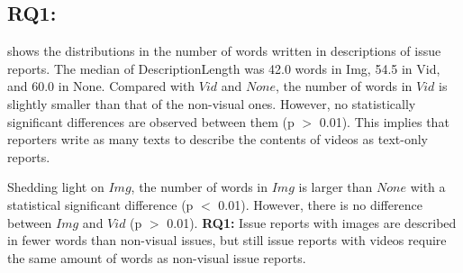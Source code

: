 % 



\subsection*{RQ1: \RQone{}}

 shows the distributions in the number of words written in descriptions of issue reports. The median of DescriptionLength was 42.0 words in Img, 54.5 in Vid, and 60.0 in None. 
Compared with $Vid$ and $None$, the number of words in $Vid$ is slightly smaller than that of the non-visual ones. However, no statistically significant differences are observed between them (p $>$ 0.01). This implies that reporters write as many texts to describe the contents of videos as text-only reports. 

Shedding light on $Img$, the number of words in $Img$ is larger than 
$None$ with a statistical significant difference (p $<$ 0.01). However, there is no difference between $Img$ and $Vid$ (p $>$ 0.01). 
\summarybox
{
{\bf RQ1: }{Issue reports with images are described in fewer words than non-visual issues, but still issue reports with videos require the same amount of words as non-visual issue reports. 
}}

